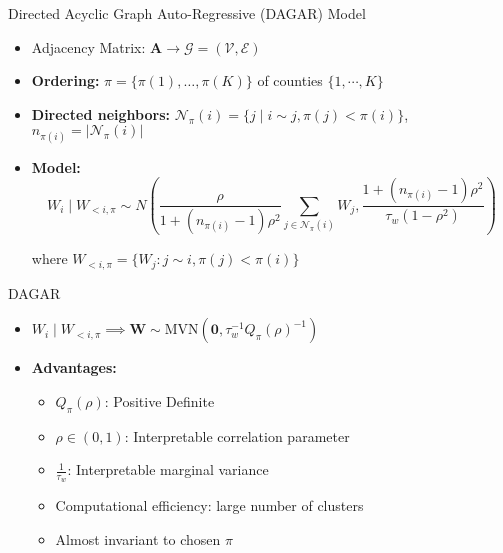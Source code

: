 \documentclass{beamer}
\begin{document}
\begin{frame}{Directed Acyclic Graph Auto-Regressive (DAGAR) Model}
\begin{itemize}


\vfill \item Adjacency Matrix: $\mathbf{A} \longrightarrow \mathcal{G} = (\mathcal{V}, \mathcal{E})$\\
\vfill \item \textbf{Ordering:} $\pi = \{\pi(1), \ldots, \pi(K)\}$ of counties $\{1,\cdots, K\}$

\vfill \item \textbf{Directed neighbors:} $\mathcal{N}_\pi(i) = \{j \mid i \sim j, \pi(j) < \pi(i)\}$, $n_{\pi(i)} = |\mathcal{N}_\pi(i)|$

\vspace{0.5cm}

\vfill \item  \textbf{Model:}
$$W_i \mid W_{<i,\pi} \sim N\left(\frac{\rho}{1+(n_{\pi(i)}-1)\rho^2}\sum_{j\in \mathcal{N}_\pi(i)} W_j, \frac{1+(n_{\pi(i)}-1)\rho^2}{\tau_w(1-\rho^2)}\right)$$

where $W_{<i,\pi} = \{W_j : j \sim i, \pi(j) < \pi(i)\}$
\end{itemize}
\end{frame}
\begin{frame}{DAGAR }
\begin{itemize}
  \vfill  \item $W_i \mid W_{<i,\pi} \implies \mathbf{W} \sim \text{MVN}(\mathbf{0}, \tau_w^{-1} Q_\pi(\rho)^{-1})$
   

   \vfill \item \textbf{Advantages:}
   \begin{itemize}
      \vfill \item $Q_\pi(\rho)$: Positive Definite 
      \vfill \item $\rho\in (0,1)$: Interpretable correlation parameter
      
      \vfill \item $\frac{1}{\tau_w}$: Interpretable marginal variance
      \vfill \item Computational efficiency: large number of clusters
      \vfill \item Almost invariant to chosen $\pi$
   \end{itemize}
   
\end{itemize}


    
\end{frame}
\end{document}
